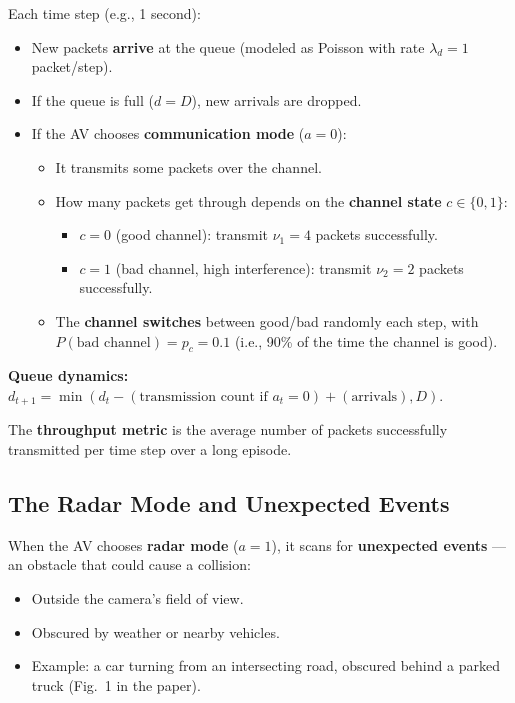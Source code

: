 \documentclass[12pt,a4paper]{article}
\begin{document}
Each time step (e.g., 1 second):
\begin{itemize}
    \item New packets \textbf{arrive} at the queue (modeled as Poisson with rate $\lambda_d = 1$ packet/step).
    \item If the queue is full ($d = D$), new arrivals are dropped.
    \item If the AV chooses \textbf{communication mode} ($a = 0$):
    \begin{itemize}
        \item It transmits some packets over the channel.
        \item How many packets get through depends on the \textbf{channel state} $c \in \{0, 1\}$:
        \begin{itemize}
            \item $c = 0$ (good channel): transmit $\nu_1 = 4$ packets successfully.
            \item $c = 1$ (bad channel, high interference): transmit $\nu_2 = 2$ packets successfully.
        \end{itemize}
        \item The \textbf{channel switches} between good/bad randomly each step, with $P(\text{bad channel}) = p_c = 0.1$ (i.e., 90\% of the time the channel is good).
    \end{itemize}
\end{itemize}

\noindent\textbf{Queue dynamics:} $d_{t+1} = \min(d_t - (\text{transmission count if } a_t=0) + (\text{arrivals}), D)$.

The \textbf{throughput metric} is the average number of packets successfully transmitted per time step over a long episode.

\subsection{The Radar Mode and Unexpected Events}

When the AV chooses \textbf{radar mode} ($a = 1$), it scans for \textbf{unexpected events} --- an obstacle that could cause a collision:
\begin{itemize}
    \item Outside the camera's field of view.
    \item Obscured by weather or nearby vehicles.
    \item Example: a car turning from an intersecting road, obscured behind a parked truck (Fig.~1 in the paper).
\end{itemize}
\end{document}
